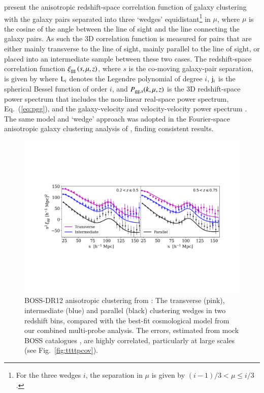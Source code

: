 \citet{sanchez/etal:2017} present the anisotropic redshift-space correlation function of galaxy clustering with the galaxy pairs separated into three `wedges' equidistant\footnote{For the three wedges $i$, the separation in $\mu$ is given by $(i-1)/3 < \mu \leq i/3$.} in $\mu$, where $\mu$ is the cosine of the angle between the line of sight and the line connecting the galaxy pairs.   As such the 3D correlation function is measured for pairs that are either mainly transverse to the line of sight, mainly parallel to the line of sight, or placed into an intermediate sample between these two cases.  The redshift-space correlation function $\xi_{\rm gg} \left( s,\mu,z \right)$, where $s$ is the co-moving galaxy-pair separation, is given by
where ${\rm L}_i$ denotes the Legendre polynomial of degree $i$, ${\rm j}_i$ is the spherical Bessel function of order $i$, and $P_{{\rm gg}, s}(k,\mu,z)$ is the 3D redshift-space power spectrum that includes the non-linear real-space power spectrum, Eq.~(\ref{eq:pgg}), and the galaxy-velocity and velocity-velocity power spectrum \citep[see][for details, including how the Alcock-Paczynski distortions are accounted for in the modelling]{sanchez/etal:2017}.     The same model and `wedge' approach was adopted in the Fourier-space anisotropic galaxy clustering analysis of \citet{grieb/etal:2017}, finding consistent results.

\begin{figure}
        \includegraphics[width=\textwidth]{Data_Plots/clustering_wedges/BOSS_Sanchez_wedges.pdf}
        \caption{BOSS-DR12 anisotropic clustering from \citet{sanchez/etal:2017}:
          The transverse (pink), intermediate (blue) and parallel
          (black) clustering wedges in two redshift bins, compared 
          with the best-fit
          cosmological model from our combined multi-probe analysis.  The errors, estimated from mock BOSS catalogues \citep{kitaura/etal:2016}, are highly correlated, particularly at large scales (see Fig.~\ref{fig:ttttpcov}).}
        \label{fig:wedges}
\end{figure}

